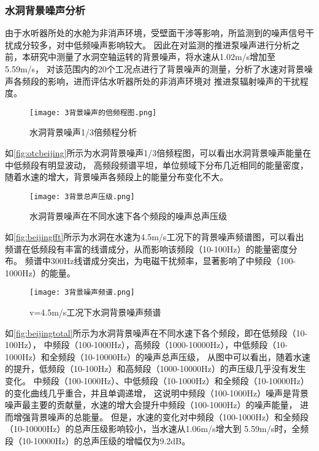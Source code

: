 \subsubsection{水洞背景噪声分析}
由于水听器所处的水舱为非消声环境，受壁面干涉等影响，所监测到的噪声信号干扰成分较多，对中低频噪声影响较大。
因此在对监测的推进泵噪声进行分析之前，本研究中测量了水洞空轴运转的背景噪声，将水速从1.02m/s增加至5.59m/s，
对该范围内的20个工况点进行了背景噪声的测量，分析了水速对背景噪声各频段的影响，进而评估水听器所处的非消声环境对
推进泵辐射噪声的干扰程度。
\begin{figure}[htbp]
    \centering
    \texttt{[image: 3背景噪声的倍频程图.png]}
    \caption{\label{fig:otcbeijing}水洞背景噪声1/3倍频程分析}
\end{figure}

如\autoref{fig:otcbeijing}所示为水洞背景噪声1/3倍频程图，可以看出水洞背景噪声能量在中低频段有明显波动，
高频段频谱平坦，单位频域下分布几近相同的能量密度，随着水速的增大，背景噪声各频段上的能量分布变化不大。
\begin{figure}[htbp]
    \centering
    \texttt{[image: 3背景总声压级.png]}
    \caption{\label{fig:beijingtotal}水洞背景噪声在不同水速下各个频段的噪声总声压级}
\end{figure}

如\autoref{fig:beijingfft}所示为水洞在水速为4.5m/s工况下的背景噪声频谱图，可以看出
频谱在低频段有丰富的线谱成分，从而影响该频段（10-100Hz）的能量密度分布。
频谱中300Hz线谱成分突出，为电磁干扰频率，显著影响了中频段（100-1000Hz）的能量。

\begin{figure}[htbp]
    \centering
    \texttt{[image: 3背景噪声频谱.png]}
    \caption{\label{fig:beijingfft}v=4.5m/s工况下水洞背景噪声频谱}
\end{figure}

如\autoref{fig:beijingtotal}所示为水洞背景噪声在不同水速下各个频段，即在低频段（10-100Hz），
中频段（100-1000Hz），高频段（1000-10000Hz），中低频段（10-1000Hz）和全频段（10-10000Hz）的噪声总声压级，
从图中可以看出，随着水速的提升，低频段（10-100Hz）和高频段（1000-10000Hz）的声压级几乎没有发生变化。
中频段（100-1000Hz）、中低频段（10-1000Hz）和全频段（10-10000Hz）的变化曲线几乎重合，并且单调递增，
这说明中频段（100-1000Hz）噪声是背景噪声最主要的贡献量，水速的增大会提升中频段（100-1000Hz）的噪声能量，
进而增强背景噪声的总能量。
但是，水速的变化对中频段（100-1000Hz）和全频段（10-10000Hz）的总声压级影响较小，当水速从1.06m/s增大到
5.59m/s时，全频段（10-10000Hz）的总声压级的增幅仅为9.2dB。

